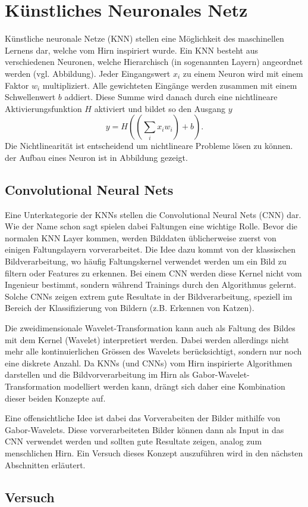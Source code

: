 \section{Künstliches Neuronales Netz}

Künstliche neuronale Netze (KNN) stellen eine Möglichkeit des maschinellen Lernens dar, welche vom Hirn inspiriert wurde.
Ein KNN besteht aus verschiedenen Neuronen, welche Hierarchisch (in sogenannten Layern) angeordnet werden (vgl. Abbildung). %
Jeder Eingangswert $x_i$ zu einem Neuron wird mit einem Faktor $w_i$ multipliziert.
Alle gewichteten Eingänge werden zusammen mit einem Schwellenwert $b$ addiert.
Diese Summe wird danach durch eine nichtlineare Aktivierungsfunktion $H$ aktiviert und bildet so den Ausgang $y$
\begin{equation}
y=H((\sum_{i} x_i w_i)+b).
\end{equation}
Die Nichtlinearität ist entscheidend um nichtlineare Probleme lösen zu können.
der Aufbau eines Neuron ist in Abbildung gezeigt. %

\subsection{Convolutional Neural Nets}

Eine Unterkategorie der KNNs stellen die Convolutional Neural Nets (CNN) dar.
Wie der Name schon sagt spielen dabei Faltungen eine wichtige Rolle.
Bevor die normalen KNN Layer kommen, werden Bilddaten üblicherweise zuerst von einigen Faltungslayern vorverarbeitet.
Die Idee dazu kommt von der klassischen Bildverarbeitung, wo häufig Faltungskernel verwendet werden um ein Bild zu filtern oder Features zu erkennen.
Bei einem CNN werden diese Kernel nicht vom Ingenieur bestimmt, sondern während Trainings durch den Algorithmus gelernt.  %
Solche CNNs zeigen extrem gute Resultate in der Bildverarbeitung, speziell im Bereich der Klassifizierung von Bildern (z.B. Erkennen von Katzen).

Die zweidimensionale Wavelet-Transformation kann auch als Faltung des Bildes mit dem Kernel (Wavelet) interpretiert werden.
Dabei werden allerdings nicht mehr alle kontinuierlichen Grössen des Wavelets berücksichtigt, sondern nur noch eine diskrete Anzahl.
Da KNNs (und CNNs) vom Hirn inspirierte Algorithmen darstellen und die Bildvorverarbeitung im Hirn als Gabor-Wavelet-Transformation modelliert werden kann, drängt sich daher eine Kombination dieser beiden Konzepte auf.

Eine offensichtliche Idee ist dabei das Vorverabeiten der Bilder mithilfe von Gabor-Wavelets.
Diese vorverarbeiteten Bilder können dann als Input in das CNN verwendet werden und sollten gute Resultate zeigen, analog zum menschlichen Hirn.
Ein Versuch dieses Konzept auszuführen wird in den nächsten Abschnitten erläutert. %

\subsection{Versuch}

